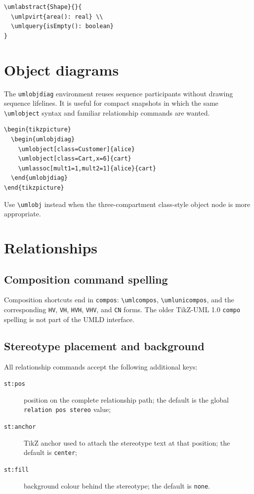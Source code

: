 \documentclass[a4paper,11pt]{report}
\begin{document}
\begin{lstlisting}
\umlabstract{Shape}{}{
  \umlpvirt{area(): real} \\
  \umlquery{isEmpty(): boolean}
}
\end{lstlisting}

\section{Object diagrams}

The \lstinline!umlobjdiag! environment reuses sequence participants without
drawing sequence lifelines. It is useful for compact snapshots in which the
same \lstinline!\umlobject! syntax and familiar relationship commands are
wanted.

\begin{lstlisting}
\begin{tikzpicture}
  \begin{umlobjdiag}
    \umlobject[class=Customer]{alice}
    \umlobject[class=Cart,x=6]{cart}
    \umlassoc[mult1=1,mult2=1]{alice}{cart}
  \end{umlobjdiag}
\end{tikzpicture}
\end{lstlisting}

Use \lstinline!\umlobj! instead when the three-compartment class-style object
node is more appropriate.

\section{Relationships}

\subsection{Composition command spelling}

Composition shortcuts end in \texttt{compos}: \lstinline!\umlcompos!,
\lstinline!\umlunicompos!, and the corresponding \texttt{HV}, \texttt{VH},
\texttt{HVH}, \texttt{VHV}, and \texttt{CN} forms. The older TikZ-UML 1.0
\texttt{compo} spelling is not part of the UMLD interface.

\subsection{Stereotype placement and background}

All relationship commands accept the following additional keys:

\begin{description}
	\item[\texttt{st:pos}] position on the complete relationship path; the default
	      is the global \texttt{relation pos stereo} value;
	\item[\texttt{st:anchor}] TikZ anchor used to attach the stereotype text at
	      that position; the default is \texttt{center};
	\item[\texttt{st:fill}] background colour behind the stereotype; the default
	      is \texttt{none}.
\end{description}
\end{document}
